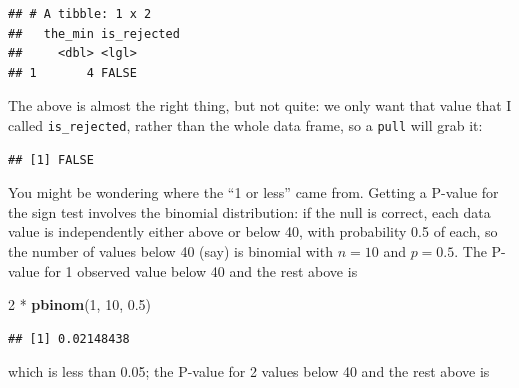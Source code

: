 \documentclass[]{tufte-book}
\newenvironment{Shaded}{}{}
\newcommand{\DataTypeTok}[1]{\textcolor[rgb]{0.56,0.13,0.00}{#1}}
\newcommand{\DecValTok}[1]{\textcolor[rgb]{0.25,0.63,0.44}{#1}}
\newcommand{\FloatTok}[1]{\textcolor[rgb]{0.25,0.63,0.44}{#1}}
\newcommand{\KeywordTok}[1]{\textcolor[rgb]{0.00,0.44,0.13}{\textbf{#1}}}
\newcommand{\NormalTok}[1]{#1}
\newcommand{\OperatorTok}[1]{\textcolor[rgb]{0.40,0.40,0.40}{#1}}
\newcommand{\StringTok}[1]{\textcolor[rgb]{0.25,0.44,0.63}{#1}}
\theoremstyle{definition}
\theoremstyle{definition}
\theoremstyle{definition}
\theoremstyle{remark}
\begin{document}
\begin{verbatim}
## # A tibble: 1 x 2
##   the_min is_rejected
##     <dbl> <lgl>      
## 1       4 FALSE
\end{verbatim}

The above is almost the right thing, but not quite: we only want that
value that I called \texttt{is\_rejected}, rather than the whole data
frame, so a \texttt{pull} will grab it:

\begin{Shaded}
\end{Shaded}

\begin{verbatim}
## [1] FALSE
\end{verbatim}

You might be wondering where the ``1 or less'' came from. Getting a
P-value for the sign test involves the binomial distribution: if the
null is correct, each data value is independently either above or below
40, with probability 0.5 of each, so the number of values below 40 (say)
is binomial with \(n=10\) and \(p=0.5\). The P-value for 1 observed
value below 40 and the rest above is

\begin{Shaded}
\begin{Highlighting}[]
\DecValTok{2} \OperatorTok{*}\StringTok{ }\KeywordTok{pbinom}\NormalTok{(}\DecValTok{1}\NormalTok{, }\DecValTok{10}\NormalTok{, }\FloatTok{0.5}\NormalTok{)}
\end{Highlighting}
\end{Shaded}

\begin{verbatim}
## [1] 0.02148438
\end{verbatim}

which is less than 0.05; the P-value for 2 values below 40 and the rest
above is
\end{document}
